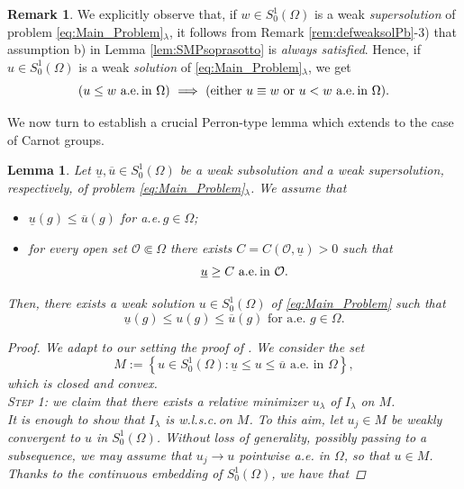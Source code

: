 \documentclass[11pt]{amsart}
\numberwithin{equation}{section} %
\newtheorem{lemma}[teo]{Lemma}
\theoremstyle{definition}
\newtheorem{rmk}[teo]{Remark}
\def\Oo{\mathcal O}
\begin{document}
\begin{rmk} \label{rem:assumptionbnonserve}
	We explicitly observe that, if $w\in S^{1}_{0}(\Omega)$ is a weak \emph{supersolution}
	of problem \eqref{eq:Main_Problem}$_\lambda$, it follows from Remark \ref{rem:defweaksolPb}-3) that
	assumption b) in Lemma \ref{lem:SMPsoprasotto} is \emph{always satisfied}. 
	Hence, if $u\in S^{1}_{0}(\Omega)$ is a weak \emph{solution} of \eqref{eq:Main_Problem}$_\lambda$, we get
	$$(\text{$u\leq w$ a.e.\,in $\Omega$})\,\,\Longrightarrow\,\,(
	\text{either $u\equiv w$ or $u < w$ a.e.\,in $\Omega$}).$$
\end{rmk}

We now turn to establish a crucial Perron-type lemma which extends \cite[Lemma 2.2]{Haitao} to the case of Carnot groups.
\begin{lemma}\label{lem:2.2Haitao}
	Let $\underline{u}, \overline{u}\in S^{1}_{0}(\Omega)$ be a weak subsolution and a weak supersolution, respectively, of problem \eqref{eq:Main_Problem}$_\lambda$. 
	We assume that 
	\begin{itemize}
		\item[a)] $\underline{u}(g) \leq \overline{u}(g)$ for a.e.\,$g\in \Omega$;
		\item[b)] for every open set $\Oo\Subset\Omega$ there exists
		$C = C(\Oo,\underline{u}) > 0$ such that
		$$\text{$\underline{u}\geq C$ a.e.\,in $\Oo$}.$$
	\end{itemize}
	Then, there exists a weak solution $u \in S^{1}_{0}(\Omega)$ of \eqref{eq:Main_Problem} such that 
	$$\text{$\underline{u}(g) \leq u(g) \leq \overline{u}(g)$ for a.e. $g \in \Omega$}.$$
	\begin{proof}
		We adapt to our setting the proof of \cite[Lemma 2.2]{Haitao}.
		We consider the set 
		\begin{equation*}
			M := \left\{ u \in S^{1}_{0}(\Omega): \underline{u} \leq u \leq \overline{u} \textrm{ a.e. in } \Omega \right\},
		\end{equation*}
		\noindent which is closed and convex.\\
		\indent \textsc{Step 1:} we claim that there exists a relative minimizer $u_{\lambda}$ of $I_{\lambda}$ on $M$.\\
		\noindent It is enough to show that $I_{\lambda}$ is w.l.s.c.\,on $M$. To this aim, let $u_j \in M$ be weakly convergent to $u$ in $S^{1}_{0}(\Omega)$. Without loss of generality, possibly passing to a subsequence, we may assume that $u_j \to u$ pointwise a.e. in $\Omega$, so that $u\in M$.
		Thanks to the continuous embedding of $S^{1}_{0}(\Omega)$, we have that

\end{proof}
\end{lemma}
\end{document}
